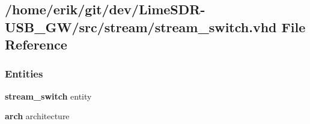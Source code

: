 \subsection{/home/erik/git/dev/\+Lime\+S\+D\+R-\/\+U\+S\+B\+\_\+\+G\+W/src/stream/stream\+\_\+switch.vhd File Reference}
\label{stream__switch_8vhd}
\subsubsection*{Entities}
\begin{DoxyCompactItemize}
\item 
{\bf stream\+\_\+switch} entity
\item 
{\bf arch} architecture
\end{DoxyCompactItemize}
